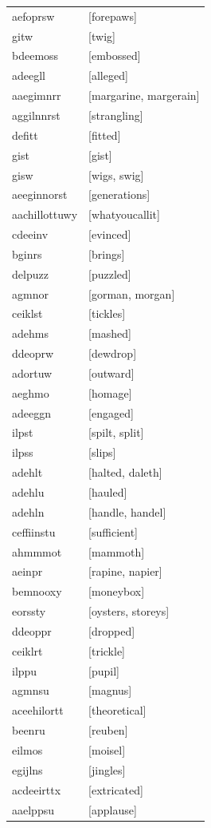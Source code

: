 \documentclass{article}
\begin{document}
\begin{tabular}{ll}
aefoprsw & [forepaws] \\
gitw & [twig] \\
bdeemoss & [embossed] \\
adeegll & [alleged] \\
aaegimnrr & [margarine, margerain] \\
aggilnnrst & [strangling] \\
defitt & [fitted] \\
gist & [gist] \\
gisw & [wigs, swig] \\
aeeginnorst & [generations] \\
aachillottuwy & [whatyoucallit] \\
cdeeinv & [evinced] \\
bginrs & [brings] \\
delpuzz & [puzzled] \\
agmnor & [gorman, morgan] \\
ceiklst & [tickles] \\
adehms & [mashed] \\
ddeoprw & [dewdrop] \\
adortuw & [outward] \\
aeghmo & [homage] \\
adeeggn & [engaged] \\
ilpst & [spilt, split] \\
ilpss & [slips] \\
adehlt & [halted, daleth] \\
adehlu & [hauled] \\
adehln & [handle, handel] \\
ceffiinstu & [sufficient] \\
ahmmmot & [mammoth] \\
aeinpr & [rapine, napier] \\
bemnooxy & [moneybox] \\
eorssty & [oysters, storeys] \\
ddeoppr & [dropped] \\
ceiklrt & [trickle] \\
ilppu & [pupil] \\
agmnsu & [magnus] \\
aceehilortt & [theoretical] \\
beenru & [reuben] \\
eilmos & [moisel] \\
egijlns & [jingles] \\
acdeeirttx & [extricated] \\
aaelppsu & [applause] \\

\end{tabular}
\end{document}
